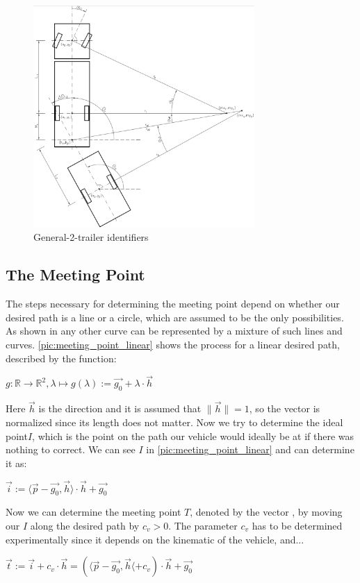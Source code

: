 \begin{figure}[h]
\centering
\includegraphics[width=0.75\textwidth]{./Chapters/Figures/vehicle_kinematic.png}
\caption{General-2-trailer identifiers \cite{12} \label{pic:vehicle_kinematic}}
\end{figure}

\subsection{The Meeting Point}
\label{sec:meeting_point}

The steps necessary for determining the meeting point depend on whether our desired path is a line or a circle, which are assumed to be the only possibilities. As shown in \cite{12} any other curve can be represented by a mixture of such lines and curves.
\ref{pic:meeting_point_linear} shows the process for a linear desired path, described by the function:
\begin{center}
$g:\mathbb{R} \to \mathbb{R}^2 , \lambda \mapsto g(\lambda ) := \vec{g_0} + \lambda \cdot \vec{h}$
\end{center}
Here $\vec{h}$ is the direction and it is assumed that $\|\vec{h}\|=1$, so the vector is normalized since its length does not matter. Now we try to determine the ideal point$I$, which is the point on the path our vehicle would ideally be at if there was nothing to correct. We can see $I$ in \ref{pic:meeting_point_linear} and can determine it as:
\begin{center}
$\vec{i}:= \langle \vec{p}-\vec{g_0}, \vec{h} \rangle \cdot \vec{h} + \vec{g_0}$
\end{center}
Now we can determine the meeting point $T$, denoted by the vector , by moving our $I$ along the desired path by $c_v>0$. The parameter $c_v$ has to be determined experimentally since it depends on the kinematic of the vehicle, and...
\begin{center}
$\vec{t}:=\vec{i}+c_v \cdot \vec{h} = ( \langle \vec{p} - \vec{g_0}, \vec{h} \langle + c_v) \cdot \vec{h} + \vec{g_0}$
\end{center}

